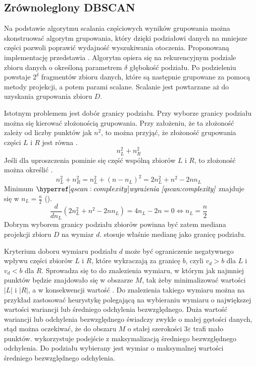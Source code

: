 \subsection{Zrównoleglony DBSCAN}
Na podstawie algorytmu scalania częściowych wyników grupowania można skonstruować algorytm grupowania, który dzięki podziałowi danych na mniejsze części pozwoli poprawić wydajność wyszukiwania otoczenia. Proponowaną implementację przedstawia . Algorytm opiera się na rekurencyjnym podziale zbioru danych o określoną parametrem $ \delta $ głębokość podziału. Po podzieleniu powstaje $ 2^\delta $ fragmentów zbioru danych, które są następnie grupowane za pomocą metody projekcji, a potem parami scalane. Scalanie jest powtarzane aż do uzyskania grupowania zbioru $ D $.\par

Istotnym problemem jest dobór granicy podziału. Przy wyborze granicy podziału można się kierować złożonością grupowania. Przy założeniu, że ta złożoność zależy od liczby punktów jak $ n^2 $, to można przyjąć, że złożoność grupowania części $ L $ i $ R $ jest równa .
\begin{equation} \label{qscan:complexity}
	n_L^2 + n_R^2
\end{equation}
Jeśli dla uproszczenia pominie się część wspólną zbiorów $ L $ i $ R $, to złożoność można określić .
\begin{equation} \label{qscan:complexity-fixed}
	n_L^2 + n_R^2 = n_L^2 + (n-n_L)^2 = 2n_L^2 + n^2 - 2nn_L
\end{equation}
Minimum $ \myhyperref{qscan:complexity}{wyrażenia} $ znajduje się w $ n_L = \frac{n}{2} $ ().
\begin{equation} \label{qscan:complexity:label}
	\frac{d}{dn_L}(2n_L^2 + n^2 - 2nn_L) = 4n_L - 2n = 0 \iff n_L = \frac{n}{2}
\end{equation}
Dobrym wyborem granicy podziału zbiorów powinna być zatem mediana projekcji zbioru $ D $ na wymiar $ d $.  stosuje właśnie medianę jako granicę podziału.\par
Kryterium doboru wymiaru podziału $ d $ może być ograniczenie negatywnego wpływu części zbiorów $ L $ i $ R $, które wykraczają za granicę $ b $, czyli $ v_d > b $ dla $ L $ i $ v_d < b $ dla $ R $. Sprowadza się to do znalezienia wymiaru, w którym jak najmniej punktów będzie znajdowało się w obszarze $ M $, tak żeby minimalizować wartości $ |L| $ i $ |R| $, a w konsekwencji wartość . Do znalezienia takiego wymiaru można na przykład zastosować heurystykę polegającą na wybieraniu wymiaru o największej wartości wariancji lub średniego odchylenia bezwzględnego. Duża wartość wariancji lub odchylenia bezwzględnego świadczy zwykle o małej gęstości danych, stąd można oczekiwać, że do obszaru $ M $ o stałej szerokości $ 3\varepsilon $ trafi mało punktów.  wykorzystuje podejście z maksymalizacją średniego bezwzględnego odchylenia. Do podziału wybierany jest wymiar o maksymalnej wartości średniego bezwzględnego odchylenia.\par

